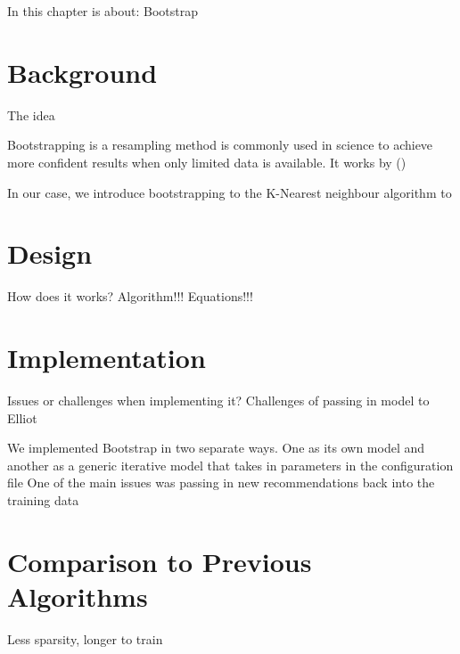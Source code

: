 In this chapter is about: Bootstrap

\section{Background}
The idea

Bootstrapping is a resampling method is commonly used in science to achieve more confident results when only limited data is available. It works by ()

In our case, we introduce bootstrapping to the K-Nearest neighbour algorithm to 

\section{Design}
How does it works?
Algorithm!!!
Equations!!!

\section{Implementation}
Issues or challenges when implementing it?
Challenges of passing in model to Elliot

We implemented Bootstrap in two separate ways. One as its own model and another as a generic iterative model that takes in parameters in the configuration file
One of the main issues was passing in new recommendations back into the training data

\section{Comparison to Previous Algorithms}
Less sparsity, longer to train